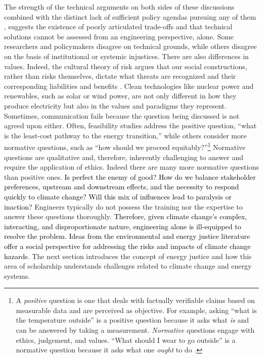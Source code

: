 The strength of the technical arguments on both sides of these discussions
combined with the distinct lack of sufficient policy agendas pursuing any of
them \cite{roelfsema_taking_2020,hale_assessing_2022}, suggests the existence of
poorly articulated trade-offs and that technical solutions cannot be assessed
from an engineering perspective, alone. Some researchers and policymakers
disagree on technical grounds, while others disagree on the basis of
institutional or systemic injustices. There are also differences in values.
Indeed, the cultural theory of risk argues that our social constructions, rather
than risks themselves, dictate what threats are recognized and their
corresponding liabilities and benefits \cite{mcneeley_cultural_2014,
van_de_graaff_understanding_2016}. Clean technologies like nuclear power and
renewables, such as solar or wind power, are not only different in how they
produce electricity but also in the values and paradigms they represent.
Sometimes, communication fails because the question being discussed is not
agreed upon either. Often, feasibility studies address the positive question,
``what is the least-cost pathway to the energy transition,'' while others
consider more normative questions, such as ``how should we proceed equitably?''\footnote{
    A \textit{positive} question is one that deals with factually
verifiable claims based on measurable data and are perceived as objective. For
example, asking ``what is the temperature outside'' is a positive question
because it asks what \textit{is} and can be answered by taking a measurement.
\textit{Normative} questions engage with ethics, judgement, and values. ``What
should I wear to go outside'' is a normative question because it asks what one
\textit{ought} to do \cite{hands_positive-normative_2012}.} Normative questions
are qualitative and, therefore, inherently challenging to answer and require the
application of ethics. Indeed there are many more normative questions than
positive ones. \textcolor{black}{Is perfect the enemy of good? How do we balance
stakeholder preferences, upstream and downstream effects, and the necessity to
respond quickly to climate change? Will this mix of influences lead to paralysis
or inaction?} Engineers typically do not possess the training nor the expertise
to answer these questions thoroughly. \textcolor{black}{Therefore, given climate
change's complex, interacting, and disproportionate nature, engineering alone is
ill-equipped to resolve the problem. Ideas from the environmental and energy
justice literature offer a social perspective for addressing the risks and
impacts of climate change hazards.} The next section introduces the concept of
energy justice and how this area of scholarship understands challenges related
to climate change and energy systems.

